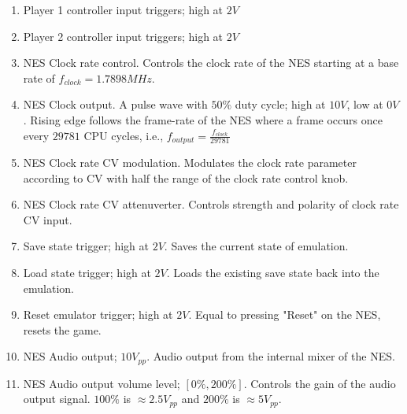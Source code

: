 \documentclass[12pt,a4paper]{article}
\begin{document}
\begin{enumerate}
  \item Player 1 controller input triggers; high at $2V$
  \item Player 2 controller input triggers; high at $2V$
  \item NES Clock rate control. Controls the clock rate of the NES starting at a base rate of $f_{clock} = 1.7898MHz$.
  \item NES Clock output. A pulse wave with $50\%$ duty cycle; high at $10V$, low at $0V$. Rising edge follows the frame-rate of the NES where a frame occurs once every $29781$ CPU cycles, i.e., $f_{output} = \frac{f_{clock}}{29781}$
  \item NES Clock rate CV modulation. Modulates the clock rate parameter according to CV with half the range of the clock rate control knob.
  \item NES Clock rate CV attenuverter. Controls strength and polarity of clock rate CV input.
  \item Save state trigger; high at $2V$. Saves the current state of emulation.
  \item Load state trigger; high at $2V$. Loads the existing save state back into the emulation.
  \item Reset emulator trigger; high at $2V$. Equal to pressing "Reset" on the NES, resets the game.
  \item NES Audio output; $10V_{pp}$. Audio output from the internal mixer of the NES.
  \item NES Audio output volume level; $[0\%,200\%]$. Controls the gain of the audio output signal. $100\%$ is $\approx 2.5V_{pp}$ and $200\%$ is $\approx 5V_{pp}$.
\end{enumerate}


\clearpage
\renewcommand\refname{References \& Acknowledgments}
\nocite{*}


\end{document}
